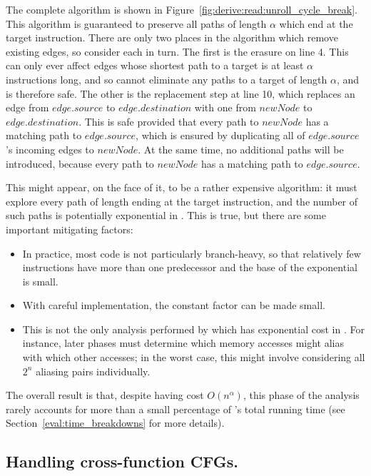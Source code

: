 The complete algorithm is shown in
Figure~\ref{fig:derive:read:unroll_cycle_break}.  This algorithm is
guaranteed to preserve all paths of length $\alpha$ which end at the
target instruction.  There are only two places in the algorithm which
remove existing edges, so consider each in turn.  The first is the
erasure on line 4.  This can only ever affect edges whose shortest
path to a target is at least $\alpha$ instructions long, and so cannot
eliminate any paths to a target of length $\alpha$, and is therefore
safe.  The other is the replacement step at line 10, which replaces an
edge from $edge.source$ to $edge.destination$ with one from $newNode$
to $edge.destination$.  This is safe provided that every path to
$newNode$ has a matching path to $edge.source$, which is ensured by
duplicating all of $edge.source$'s incoming edges to $newNode$.  At
the same time, no additional paths will be introduced, because every
path to $newNode$ has a matching path to $edge.source$.

This might appear, on the face of it, to be a rather expensive
algorithm: it must explore every path of length \backref{$\alpha$}
ending at the target instruction, and the number of such paths is
potentially exponential in \backref{$\alpha$}.  This is true, but
there are some important mitigating factors:

\begin{itemize}
\item In practice, most code is not particularly branch-heavy, so that
  relatively few instructions have more than one predecessor and the
  base of the exponential is small.
\item With careful implementation, the constant factor can be made
  small.
\item This is not the only analysis performed by {\technique} which
  has exponential cost in \backref{$\alpha$}.  For instance, later
  phases must determine which memory accesses might alias with which
  other accesses; in the worst case, this might involve considering
  all $2^n$ aliasing pairs individually.
\end{itemize}

The overall result is that, despite having cost $O(n^{\alpha})$, this
phase of the analysis rarely accounts for more than a small percentage
of {\implementation}'s total running time (see
Section~\ref{eval:time_breakdowns} for more details).
  
\subsection{Handling cross-function CFGs.}

